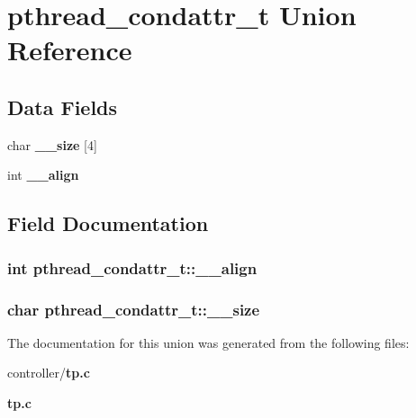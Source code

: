 \section{pthread\_\-condattr\_\-t Union Reference}
\label{unionpthread__condattr__t}
\subsection*{Data Fields}
\begin{DoxyCompactItemize}
\item 
char {\bf \_\-\_\-size} [4]
\item 
int {\bf \_\-\_\-align}
\end{DoxyCompactItemize}


\subsection{Field Documentation}
\subsubsection[{\_\-\_\-align}]{\setlength{\rightskip}{0pt plus 5cm}int {\bf pthread\_\-condattr\_\-t::\_\-\_\-align}}\label{unionpthread__condattr__t_ab8450ff960dfe7de672a9564b3cb0642}
\subsubsection[{\_\-\_\-size}]{\setlength{\rightskip}{0pt plus 5cm}char {\bf pthread\_\-condattr\_\-t::\_\-\_\-size}}\label{unionpthread__condattr__t_a626d5a3798c803e48512ef619cca713b}


The documentation for this union was generated from the following files:\begin{DoxyCompactItemize}
\item 
controller/{\bf tp.c}\item 
{\bf tp.c}\end{DoxyCompactItemize}
